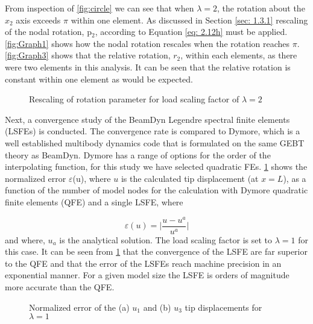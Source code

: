 \documentclass[letterpaper,12pt]{article}
\begin{document}
From inspection of \ref{fig:circle} we can see that when $\lambda=2$, the rotation about the $x_2$ axis exceeds $\pi$ within one element. As discussed in Section \ref{sec: 1.3.1} rescaling of the nodal rotation, p$_{2}$, according to Equation \ref{eq: 2.12h} must be applied. \ref{fig:Graph1} shows how the nodal rotation rescales when the rotation reaches $\pi$. \ref{fig:Graph3} shows that the relative rotation, $r_2$, within each elements, as there were two elements in this analysis. It can be seen that the relative rotation is constant within one element as would be expected.

\begin{figure}
	\begin{center}
		\caption{Rescaling of rotation parameter for load scaling factor of $\lambda=2$}
	\end{center}
\end{figure}

Next, a convergence study of the BeamDyn Legendre spectral finite elements (LSFEs) is conducted. The convergence rate is compared to Dymore, which is a well established multibody dynamics code that is formulated on the same GEBT theory as BeamDyn. Dymore has a range of options for the order of the interpolating function, for this study we have selected quadratic FEs. \ref{fig:conv} shows the normalized error $\varepsilon$(u), where $u$ is the calculated tip displacement (at $x=L$), as a function of the number of model nodes for the calculation with Dymore quadratic finite elements (QFE) and a single LSFE, where

\begin{equation}
\varepsilon(u)=\bigg|\frac{u-u^a}{u^a}\bigg|
\end{equation}
and where, $u_a$ is the analytical solution. The load scaling factor is set to $\lambda = 1$ for this case. It can be seen from \ref{fig:conv} that the convergence of the LSFE are far superior to the QFE and that the error of the LSFEs reach machine precision in an exponential manner. For a given model size the LSFE is orders of magnitude more accurate than the QFE. 


\begin{figure}
	\begin{center}
		\caption{\label{fig:conv}Normalized error of the (a) $u_1$ and (b) $u_3$ tip displacements for $\lambda=1$}
	\end{center}
\end{figure}
\end{document}
